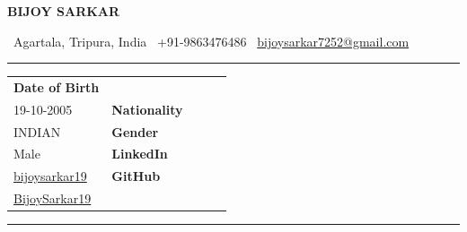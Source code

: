 \documentclass[10pt,a4paper]{article}
\begin{document}

\begin{center}

    {\Huge\bfseries BIJOY SARKAR}

    \vspace{4pt}

    \small
    \faMapMarker\ Agartala, Tripura, India
    \hspace{10pt}
    \faPhone\ +91-9863476486
    \hspace{10pt}
    \faEnvelope\ 
    \href{mailto:bijoysarkar7252@gmail.com}
    {bijoysarkar7252@gmail.com}

    \vspace{3pt}


\end{center}

\vspace{-3pt}
\rule{\textwidth}{0.8pt}
\vspace{4pt}


\begin{tabularx}{\textwidth}{@{}X X X X X@{}}

\centering
\textbf{Date of Birth}\\
19-10-2005

&
\centering
\textbf{Nationality}\\
INDIAN

&
\centering
\textbf{Gender}\\
Male

&
\centering
\textbf{LinkedIn}\\
\href{https://www.linkedin.com/in/bijoysarkar19}
{bijoysarkar19}

&
\centering
\textbf{GitHub}\\
\href{https://github.com/BijoySarkar19}
{BijoySarkar19}

\end{tabularx}

\vspace{5pt}
\rule{\textwidth}{0.6pt}
\end{document}
